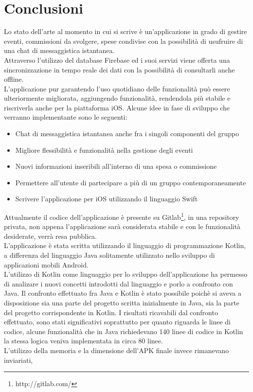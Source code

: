 \chapter*{Conclusioni}

Lo stato dell'arte al momento in cui si scrive \`e un'applicazione in grado di gestire eventi, commissioni da svolgere, spese condivise con la possibilità di usufruire di una chat di messaggistica istantanea.\\
Attraverso l'utilizzo del database Firebase ed i suoi servizi viene offerta una sincronizzazione in tempo reale dei dati con la possibilità di consultarli anche offline.\\
L'applicazione pur garantendo l'uso quotidiano delle funzionalità può essere ulteriormente migliorata, aggiungendo funzionalità, rendendola più stabile e riscriverla anche per la piattaforma iOS. Alcune idee in fase di sviluppo che verranno implementante sono le seguenti:
\begin{itemize}
  \item Chat di messaggistica istantanea anche fra i singoli componenti del gruppo
  \item Migliore flessibilità e funzionalità nella gestione degli eventi
  \item Nuovi informazioni inseribili all'interno di una spesa o commissione
  \item Permettere all'utente di partecipare a più di un gruppo contemporaneamente
  \item Scrivere l'applicazione per iOS utilizzando il linguaggio Swift
\end{itemize}
Attualmente il codice dell'applicazione è presente su Gitlab\footnote{http://gitlab.com/}, in una repository privata, non appena l'applicazione sarà considerata stabile e con le funzionalità desiderate, verrà resa pubblica.\\
L'applicazione è stata scritta utilizzando il linguaggio di programmazione Kotlin, a differenza del linguaggio Java solitamente utilizzato nello sviluppo di applicazioni mobili Android.\\ L'utilizzo di Kotlin come linguaggio per lo sviluppo dell'applicazione ha permesso di analizare i nuovi concetti introdotti dal linguaggio e porlo a confronto con Java. Il confronto effettuato fra Java e Kotlin è stato possibile poichè si aveva a disposizione sia una parte del progetto scritta inizialmente in Java, sia la parte del progetto corrispondente in Kotlin.
I risultati ricavabili dal confronto effettuato, sono stati significativi soprattutto per quanto riguarda le linee di codice, alcune funzionalità che in Java richiedevano 140 linee di codice in Kotlin la stessa logica veniva implementata in circa 80 linee.\\
L'utilizzo della memoria e la dimensione dell'APK finale invece rimanevano inviariati,

